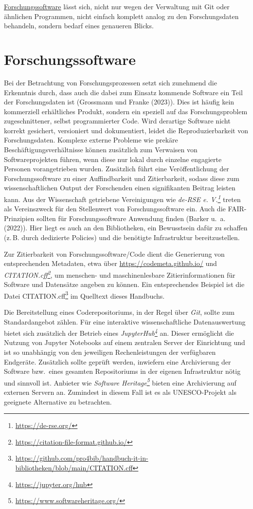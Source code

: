 \documentclass[
  11pt,
  letterpaper,
  DIV=11,
  twoside]{scrreprt}
\DeclareRobustCommand{\href}[2]{#2\footnote{\url{#1}}}
\begin{document}
\hyperref[forschungssoftware]{Forschungssoftware} lässt sich, nicht nur
wegen der Verwaltung mit Git oder ähnlichen Programmen, nicht einfach
komplett analog zu den Forschungsdaten behandeln, sondern bedarf eines
genaueren Blicks.

\section{Forschungssoftware}\label{forschungssoftware}

Bei der Betrachtung von Forschungsprozessen setzt sich zunehmend die
Erkenntnis durch, dass auch die dabei zum Einsatz kommende Software ein
Teil der Forschungsdaten ist (Grossmann und Franke (2023)). Dies ist
häufig kein kommerziell erhältliches Produkt, sondern ein speziell auf
das Forschungsproblem zugeschnittener, selbst programmierter Code. Wird
derartige Software nicht korrekt gesichert, versioniert und
dokumentiert, leidet die Reproduzierbarkeit von Forschungsdaten.
Komplexe externe Probleme wie prekäre Beschäftigungsverhältnisse können
zusätzlich zum Verwaisen von Softwareprojekten führen, wenn diese nur
lokal durch einzelne engagierte Personen vorangetrieben wurden.
Zusätzlich führt eine Veröffentlichung der Forschungssoftware zu einer
Auffindbarkeit und Zitierbarkeit, sodass diese zum wissenschaftlichen
Output der Forschenden einen signifikanten Beitrag leisten kann. Aus der
Wissenschaft getriebene Vereinigungen wie
\emph{\href{https://de-rse.org/}{de-RSE e. V.}} treten als Vereinszweck
für den Stellenwert von Forschungssoftware ein. Auch die FAIR-Prinzipien
sollten für Forschungssoftware Anwendung finden (Barker u.~a. (2022)).
Hier liegt es auch an den Bibliotheken, ein Bewusstsein dafür zu
schaffen (z.\,B. durch dedizierte Policies) und die benötigte
Infrastruktur bereitzustellen.

Zur Zitierbarkeit von Forschungssoftware/Code dient die Generierung von
entsprechenden Metadaten, etwa über \url{https://codemeta.github.io/}
und \emph{\href{https://citation-file-format.github.io/}{CITATION.cff}},
um menschen- und maschinenlesbare Zitierinformationen für Software und
Datensätze angeben zu können. Ein entsprechendes Beispiel ist
\href{https://github.com/pro4bib/handbuch-it-in-bibliotheken/blob/main/CITATION.cff}{die
Datei CITATION.cff} im Quelltext dieses Handbuchs.

Die Bereitstellung eines Coderepositoriums, in der Regel über
\emph{Git}, sollte zum Standardangebot zählen. Für eine interaktive
wissenschaftliche Datenauswertung bietet sich zusätzlich der Betrieb
eines \emph{\href{https://jupyter.org/hub}{JupyterHub}} an. Dieser
ermöglicht die Nutzung von Jupyter Notebooks auf einem zentralen Server
der Einrichtung und ist so unabhängig von den jeweiligen
Rechenleistungen der verfügbaren Endgeräte. Zusätzlich sollte geprüft
werden, inwiefern eine Archivierung der Software bzw.~eines gesamten
Repositoriums in der eigenen Infrastruktur nötig und sinnvoll ist.
Anbieter wie \emph{\href{https://www.softwareheritage.org/}{Software
Heritage}} bieten eine Archivierung auf externen Servern an. Zumindest
in diesem Fall ist es als UNESCO-Projekt als geeignete Alternative zu
betrachten.
\end{document}

